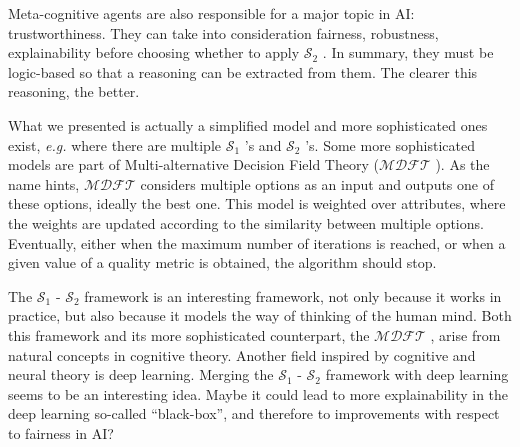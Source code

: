 \documentclass{article}
\newcommand{\so}{\ensuremath{\mathcal{S}_1} }
\newcommand{\st}{\ensuremath{\mathcal{S}_2} }
\newcommand{\mdft}{\ensuremath{\mathcal{MDFT}} }
\begin{document}
Meta-cognitive agents are also responsible for a major topic in AI: trustworthiness. They can take into consideration fairness, robustness, explainability before choosing whether to apply \st. In summary, they must be logic-based so that a reasoning can be extracted from them. The clearer this reasoning, the better.

What we presented is actually a simplified model and more sophisticated ones exist, \textit{e.g.} where there are multiple \so's and \st's. Some more sophisticated models are part of Multi-alternative Decision Field Theory (\mdft). As the name hints, \mdft considers multiple options as an input and outputs one of these options, ideally the best one. This model is weighted over attributes, where the weights are updated according to the similarity between multiple options. Eventually, either when the maximum number of iterations is reached, or when a given value of a quality metric is obtained, the algorithm should stop.

The \so- \st framework is an interesting framework, not only because it works in practice, but also because it models the way of thinking of the human mind. Both this framework and its more sophisticated counterpart, the \mdft, arise from natural concepts in cognitive theory. Another field inspired by cognitive and neural theory is deep learning. Merging the \so- \st framework with deep learning seems to be an interesting idea. Maybe it could lead to more explainability in the deep learning so-called ``black-box'', and therefore to improvements with respect to fairness in AI?







\end{document}
